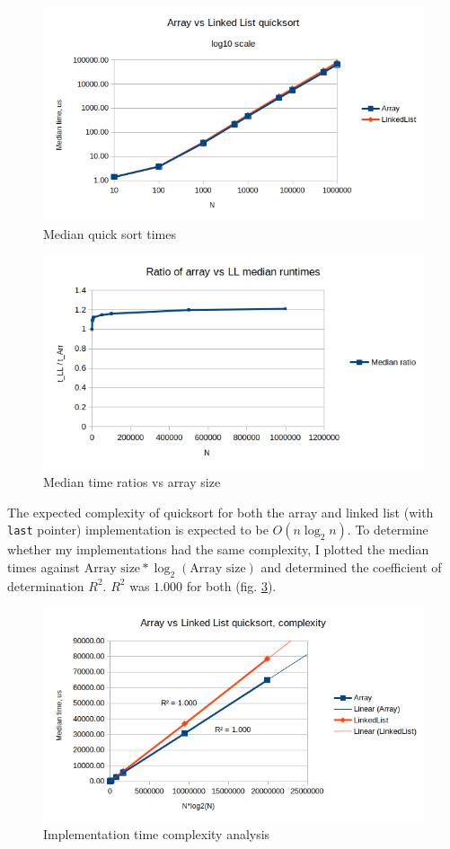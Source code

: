 \documentclass[a4paper,11pt]{article}
\begin{document}
    \begin{figure}[H]
        \centering
        \includegraphics[width=\textwidth]{quicksort.png}
        \caption{Median quick sort times}
        \label{fig:quicksort}
    \end{figure}

    \begin{figure}[H]
        \centering
        \includegraphics[width=\textwidth]{ratio.png}
        \caption{Median time ratios vs array size}
        \label{fig:ratio}
    \end{figure}

    The expected complexity of quicksort for both the array and linked list (with \texttt{last} pointer) implementation is expected to be $O(n\log_2{n})$. To determine whether my implementations had the same complexity, I plotted the median times against $\text{Array size} * \log_2{\left(\text{Array size}\right)}$ and determined the coefficient of determination $R^2$. $R^2$ was $1.000$ for both (fig. \ref{fig:complexity}).

    \begin{figure}[H]
        \centering
        \includegraphics[width=\textwidth]{complexity.png}
        \caption{Implementation time complexity analysis}
        \label{fig:complexity}
    \end{figure}
\end{document}
